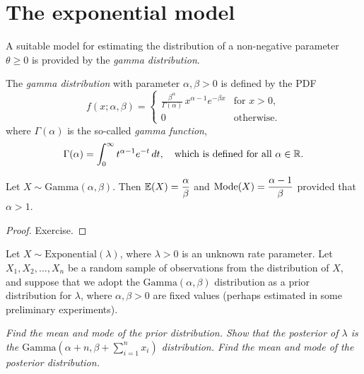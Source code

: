 \section{The exponential model}
A suitable model for estimating the distribution of a non-negative parameter $\theta\geq 0$ is provided by the \emph{gamma distribution}.

\begin{definition}\label{def:gamma_distribution}
The \emph{gamma distribution} with parameter $\alpha,\beta>0$ is defined by the PDF
\[
f(x;\alpha,\beta) = \begin{cases}
	\displaystyle\frac{\beta^{\alpha}}{\Gamma(\alpha)}\, x^{\alpha-1} e^{-\beta x} & \text{for $x>0$}, \\
	0												& \text{otherwise.}
\end{cases}
\]
where $\Gamma(\alpha)$ is the so-called \emph{gamma function},
\[
\Gamma(\alpha) = \int_0^{\infty} t^{\alpha-1}e^{-t}\,dt,
\quad\text{which is defined for all $\alpha\in\mathbb{R}$.}
\]
\end{definition}


\begin{lemma}
Let $X\sim\text{Gamma}(\alpha,\beta)$. Then $\mathbb{E}(X) = \displaystyle\frac{\alpha}{\beta}$ and $\text{Mode}(X) = \displaystyle\frac{\alpha-1}{\beta}$ provided that $\alpha > 1$.
\end{lemma}
\begin{proof}
Exercise.
\end{proof}

\begin{example}
Let $X\sim\text{Exponential}(\lambda)$, where $\lambda>0$ is an unknown rate parameter. Let $X_1,X_2,\ldots,X_n$ be a random sample of observations from the distribution of $X$, and suppose that we adopt the $\text{Gamma}(\alpha,\beta)$ distribution as a prior distribution for $\lambda$, where $\alpha,\beta>0$ are fixed values (perhaps estimated in some preliminary experiments). 

\ben
\it Find the mean and mode of the prior distribution.
\it Show that the posterior of $\lambda$ is the $\text{Gamma}(\alpha+n,\beta+\sum_{i=1}^n x_i)$ distribution.
\it Find the mean and mode of the posterior distribution.
\een
\end{example}

